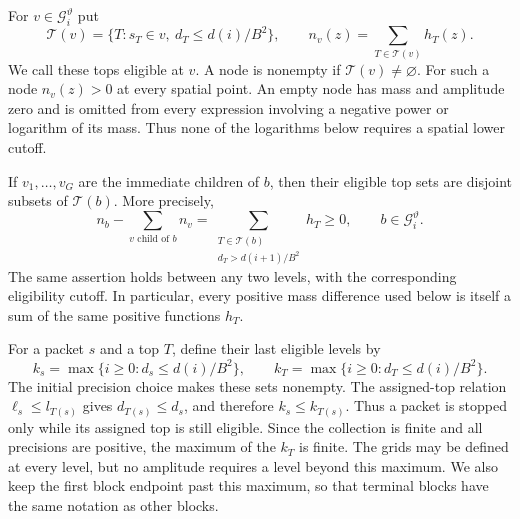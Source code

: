 For $v\in\mathcal G_i^\vartheta$ put
\begin{equation}
 \mathcal T(v)
 =\{T:s_T\in v,\ d_T\le d(i)/B^2\},
 \qquad
 n_v(z)=\sum_{T\in\mathcal T(v)}h_T(z).
 \label{hier:eligible-mass}
\end{equation}
We call these tops eligible at $v$.  A node is nonempty if
$\mathcal T(v)\ne\varnothing$.  For such a node $n_v(z)>0$ at every
spatial point.  An empty node has mass and amplitude zero and is omitted
from every expression involving a negative power or logarithm of its
mass.  Thus none of the logarithms below requires a spatial lower cutoff.

If $v_1,\ldots,v_G$ are the immediate children of $b$, then their eligible
top sets are disjoint subsets of $\mathcal T(b)$.  More precisely,
\begin{equation}
 n_b-\sum_{v\text{ child of }b}n_v
 =\sum_{\substack{T\in\mathcal T(b)\\d_T>d(i+1)/B^2}}h_T\ge0,
 \qquad b\in\mathcal G_i^\vartheta.
 \label{hier:mass-loss}
\end{equation}
The same assertion holds between any two levels, with the corresponding
eligibility cutoff.  In particular, every positive mass difference used
below is itself a sum of the same positive functions $h_T$.

For a packet $s$ and a top $T$, define their last eligible levels by
\begin{equation}
 k_s=\max\{i\ge0:d_s\le d(i)/B^2\},
 \qquad
 k_T=\max\{i\ge0:d_T\le d(i)/B^2\}.
 \label{hier:stopping-levels}
\end{equation}
The initial precision choice makes these sets nonempty.  The assigned-top
relation $\ell_s\le l_{T(s)}$ gives $d_{T(s)}\le d_s$, and therefore
$k_s\le k_{T(s)}$.  Thus a packet is stopped only while its assigned top
is still eligible.  Since the collection is finite and all precisions are
positive, the maximum of the $k_T$ is finite.  The grids may be defined at
every level, but no amplitude requires a level beyond this maximum.  We
also keep the first block endpoint past this maximum, so that terminal
blocks have the same notation as other blocks.

